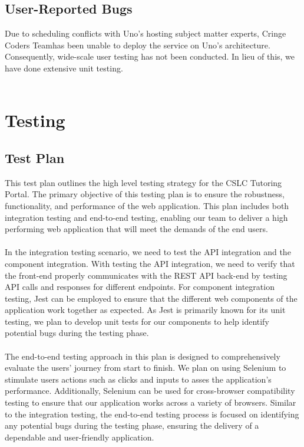 \documentclass[oneside,openany,obeyspaces]{book}
\newcommand\tab[1][1cm]{\hspace*{#1}}
\newcommand\TeamName{Cringe Coders Team}
\begin{document}
\begin{flushleft}
    \section{User-Reported Bugs}

    \tab Due to scheduling conflicts with Uno's hosting subject matter experts, \TeamName\space has been unable to deploy the service on Uno's architecture. Consequently, wide-scale user testing has not been conducted. In lieu of this, we have done extensive unit testing.\\~\\




    \chapter{Testing}

    \section{Test Plan}
    \tab This test plan outlines the high level testing strategy for the CSLC Tutoring Portal. The primary objective of this testing plan is to ensure the robustness, functionality, and performance of the web application. This plan includes both integration testing and end-to-end testing, enabling our team to deliver a high performing web application that will meet the demands of the end users.\\~\\

    \tab In the integration testing scenario, we need to test the API integration and the component integration. With testing the API integration, we need to verify that the front-end properly communicates with the REST API back-end by testing API calls and responses for different endpoints. For component integration testing, Jest can be employed to ensure that the different web components of the application work together as expected. As Jest is primarily known for its unit testing, we plan to develop unit tests for our components to help identify potential bugs during the testing phase.\\~\\

    \tab The end-to-end testing approach in this plan is designed to comprehensively evaluate the users' journey from start to finish. We plan on using Selenium to stimulate users actions such as clicks and inputs to asses the application's performance. Additionally, Selenium can be used for cross-browser compatibility testing to ensure that our application works across a variety of browsers. Similar to the integration testing, the end-to-end testing process is focused on identifying any potential bugs during the testing phase, ensuring the delivery of a dependable and user-friendly application.\\~\\



\end{flushleft}
\end{document}
